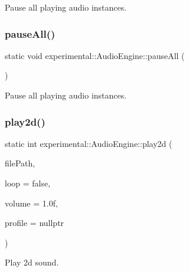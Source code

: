 Pause all playing audio instances. \mbox{\label{classexperimental_1_1AudioEngine_a3d08304458bf45967020a9ab00e91eb3}} 
\subsubsection{\texorpdfstring{pause\+All()}{pauseAll()}\hspace{0.1cm}{\footnotesize\ttfamily [2/2]}}
{\footnotesize\ttfamily static void experimental\+::\+Audio\+Engine\+::pause\+All (\begin{DoxyParamCaption}{ }\end{DoxyParamCaption})\hspace{0.3cm}{\ttfamily [static]}}

Pause all playing audio instances. \mbox{\label{classexperimental_1_1AudioEngine_ae7693b0ea2b5f2334153ebdf7ccb93d2}} 
\subsubsection{\texorpdfstring{play2d()}{play2d()}\hspace{0.1cm}{\footnotesize\ttfamily [1/2]}}
{\footnotesize\ttfamily static int experimental\+::\+Audio\+Engine\+::play2d (\begin{DoxyParamCaption}\item[{const std\+::string \&}]{file\+Path,  }\item[{bool}]{loop = {\ttfamily false},  }\item[{float}]{volume = {\ttfamily 1.0f},  }\item[{const \hyperlink{classexperimental_1_1AudioProfile}{Audio\+Profile} $\ast$}]{profile = {\ttfamily nullptr} }\end{DoxyParamCaption})\hspace{0.3cm}{\ttfamily [static]}}

Play 2d sound.


